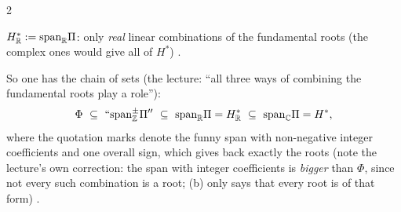 \begin{paracol}{2}
\begin{definition}\label{def:cl-hr}
$H^*_{\mathbb{R}}:=\mathrm{span}_{\mathbb{R}}\Pi$: only \emph{real} linear combinations of the fundamental roots (the complex ones would give all of $H^*$)   .
\end{definition}
So one has the chain of sets (the lecture: ``all three ways of combining the fundamental roots play a role''):
\[
  \Phi\ \subseteq\ \mathrm{``}\mathrm{span}_{\mathbb Z}^{\pm}\Pi\mathrm{''}\ \subseteq\ \mathrm{span}_{\R}\Pi=H^*_{\R}\ \subseteq\ \mathrm{span}_{\C}\Pi=H^*,
\]
where the quotation marks denote the funny span with non-negative integer coefficients and one overall sign, which gives back exactly the roots (note the lecture's own correction: the span with integer coefficients is \emph{bigger} than $\Phi$, since not every such combination is a root; (b) only says that every root is of that form)        .


\end{paracol}
